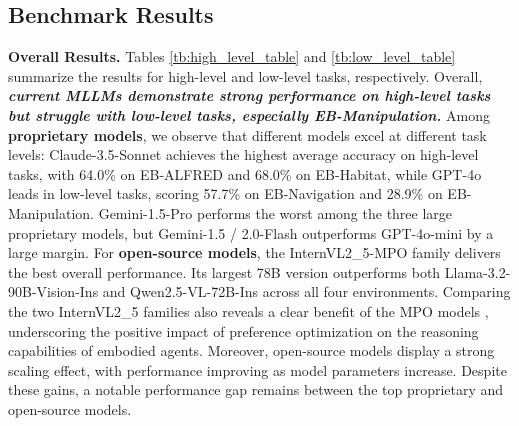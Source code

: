 

\vspace{-5pt}

\subsection{Benchmark Results}\label{sec:benchmark_res}

\textbf{Overall Results.} Tables \ref{tb:high_level_table} and \ref{tb:low_level_table} summarize the results for high-level and low-level tasks, respectively. Overall, \textit{\textbf{current MLLMs demonstrate strong performance on high-level tasks but struggle with low-level tasks, especially EB-Manipulation.}}
Among \textbf{proprietary models}, we observe that different models excel at different task levels: Claude-3.5-Sonnet achieves the highest average accuracy on high-level tasks, with 64.0\% on EB-ALFRED and 68.0\% on EB-Habitat, while GPT-4o leads in low-level tasks, scoring 57.7\% on EB-Navigation and 28.9\% on EB-Manipulation. Gemini-1.5-Pro performs the worst among the three large proprietary models, but Gemini-1.5 / 2.0-Flash outperforms GPT-4o-mini by a large margin. For \textbf{open-source models}, the InternVL2\_5-MPO family delivers the best overall performance. Its largest 78B version outperforms both Llama-3.2-90B-Vision-Ins and Qwen2.5-VL-72B-Ins across all four environments. Comparing the two InternVL2\_5 families also reveals a clear benefit of the MPO models \cite{wang2024enhancing}, underscoring the positive impact of preference optimization on the reasoning capabilities of embodied agents. Moreover, open-source models display a strong scaling effect, with performance improving as model parameters increase. Despite these gains, a notable performance gap remains between the top proprietary and open-source models.

